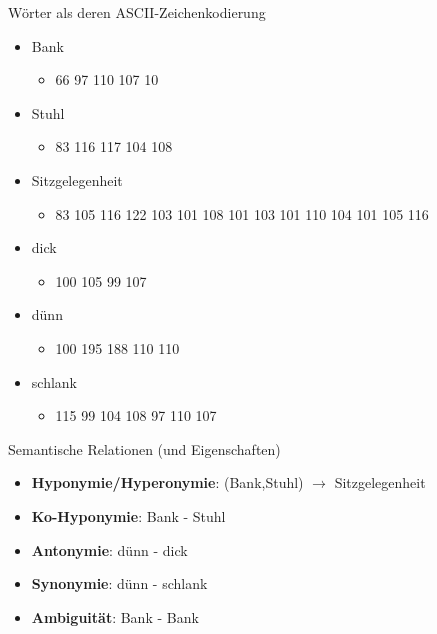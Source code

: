 \documentclass{beamer}
\begin{document}
\begin{frame}[c]{Wörter als deren ASCII-Zeichenkodierung}
	\begin{itemize}
		\item Bank
		\begin{itemize}
			\item 66 97 110 107 10 
		\end{itemize}
		\item Stuhl
		\begin{itemize}
			\item 83 116 117 104 108 
		\end{itemize}
		\item Sitzgelegenheit
		\begin{itemize}
			\item 83 105 116 122 103 101 108 101 103 101 110 104 101 105 116 
		\end{itemize}
		\item dick
		\begin{itemize}
			\item 100 105 99 107 
		\end{itemize}
		\item dünn
		\begin{itemize}
			\item 100 195 188 110 110 
		\end{itemize}
		\item schlank
		\begin{itemize}
			\item 115 99 104 108 97 110 107 
		\end{itemize}
	\end{itemize}
\end{frame}

\begin{frame}[c]{Semantische Relationen (und Eigenschaften)}
	\begin{itemize}
		\item \textbf{Hyponymie/Hyperonymie}: (Bank,Stuhl) $\rightarrow$ Sitzgelegenheit
		\item \textbf{Ko-Hyponymie}: Bank - Stuhl
		\item \textbf{Antonymie}: dünn - dick
		\item \textbf{Synonymie}: dünn - schlank
		\item \textbf{Ambiguität}: Bank - Bank
	\end{itemize}

\vspace{0.5cm}

\end{frame}
\end{document}

